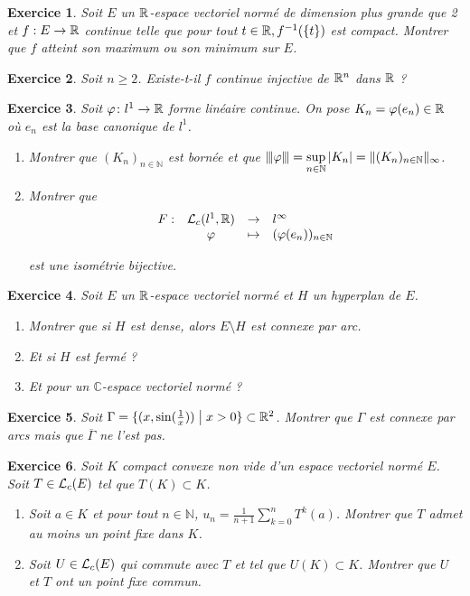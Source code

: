\documentclass[12pt]{article}
\newtheorem{exercise}{Exercice}[section]
\theoremstyle{remark}
\theoremstyle{remark}
\newcommand{\C}{\mathbb{C}} \newcommand{\Q}{\mathbb{Q}}
\newcommand{\N}{\mathbb{N}} \newcommand{\Z}{\mathbb{Z}}
\newcommand{\vertiii}[1]{{\left\vert\kern-0.25ex\left\vert\kern-0.25ex\left\vert{}#1
\right\vert\kern-0.25ex\right\vert\kern-0.25ex\right\vert}}
\newcommand{\function}[5]{
	$$
	\begin{array}{rccl}
		#1: & #2 & \to & #3 \\
		& #4 & \mapsto & #5
	\end{array}
	$$
}
\begin{document}
\begin{exercise}
	Soit $E$ un $\mathbb{R}$-espace vectoriel normé de dimension plus grande que 2 et $f:E\to\mathbb{R}$ continue telle que pour tout $t\in\mathbb{R},f^{-1}(\{t\})$ est compact. Montrer que $f$ atteint son maximum ou son minimum sur $E$.
\end{exercise}

\begin{exercise}
	Soit $n\geqslant2$. Existe-t-il $f$ continue injective de $\mathbb{R}^{n}$ dans $\mathbb{R}$ ?
\end{exercise}

\begin{exercise}
	Soit $\varphi\colon l^{1}\to\mathbb{R}$ forme linéaire continue. On pose $K_{n}=\varphi(e_{n})\in\mathbb{R}$ où $e_{n}$ est la base canonique de $l^{1}$.
	\begin{enumerate}
		\item Montrer que $(K_{n})_{n\in\N}$ est bornée et que $\vertiii{\varphi}=\sup\limits_{n\in\N}\vert K_{n}\vert=\Vert(K_{n})_{n\in\N}\Vert_{\infty}$.
		\item Montrer que \function{F}{\L_c(l^{1},\R)}{l^{\infty}}{\varphi}{(\varphi(e_{n}))_{n\in\N}}
		est une isométrie bijective.
	\end{enumerate}
\end{exercise}

\begin{exercise}
	Soit $E$ un $\mathbb{R}$-espace vectoriel normé et $H$ un hyperplan de $E$.
	\begin{enumerate}
		\item Montrer que si $H$ est dense, alors $E\setminus H$ est connexe par arc.
		\item Et si $H$ est fermé ?
		\item Et pour un $\C$-espace vectoriel normé ?
	\end{enumerate}
\end{exercise}

\begin{exercise}
	Soit $\Gamma=\{(x,\sin(\frac{1}{x}))\bigm| x>0\}\subset\mathbb{R}^{2}$. Montrer que $\Gamma$ est connexe par arcs mais que $\overline{\Gamma}$ ne l'est pas.
\end{exercise}

\begin{exercise}
	Soit $K$ compact convexe non vide d'un espace vectoriel normé $E$. Soit $T\in\mathcal{L}_{c}(E)$ tel que $T(K)\subset K$.
	\begin{enumerate}
		\item Soit $a\in K$ et pour tout $n\in\N$, $u_{n}=\frac{1}{n+1}\sum_{k=0}^{n}T^{k}(a)$. Montrer que $T$ admet au moins un point fixe dans $K$.
		\item Soit $U\in\mathcal{L}_{c}(E)$ qui commute avec $T$ et tel que $U(K)\subset K$. Montrer que $U$ et $T$ ont un point fixe commun.
	\end{enumerate}
\end{exercise}
\end{document}
